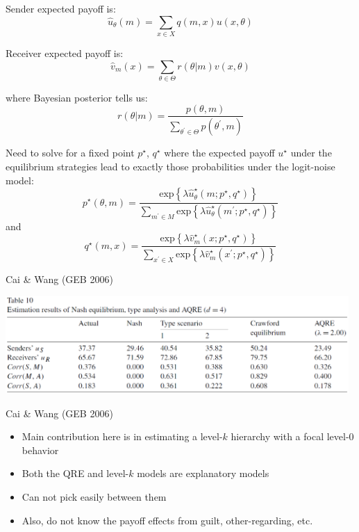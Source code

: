\documentclass{beamer}
\begin{document}
\begin{frame}
    \begin{card}
    			Sender expected payoff is:
    			$$\hat{u}_\theta(m)=\sum_{x\in X} q(m,x) u(x,\theta)$$
    			
    			Receiver expected payoff is:
    			$$\hat{v}_m(x)=\sum_{\theta\in \Theta} r(\theta\left| m\right. ) v(x,\theta )$$ 
    			
    			where Bayesian posterior tells us:
    			$$r(\theta\left| m\right. )=\frac{p(\theta,m)}{\sum_{\theta^\prime\in\Theta} p(\theta^\prime,m)}$$
    \end{card}
\end{frame}



\begin{frame}
\begin{card}
 Need to solve for a fixed point $p^\star$, $q^\star$ where the expected payoff $u^\star$ under the equilibrium strategies lead to exactly those probabilities under the logit-noise model:
 $$p^\star(\theta,m)=\frac{\text{exp}\left\{\lambda \hat{u}^\star_\theta(m;p^\star,q^\star)\right\}}{\sum_{m^\prime\in M} \text{exp}\left\{\lambda \hat{u}^\star_{\theta}(m^\prime;p^\star,q^\star)\right\}}$$
			and
			$$q^\star(m,x)= 
			\frac{\text{exp}\left\{\lambda \hat{v}^\star_m(x;p^\star,q^\star)\right\} }{\sum_{x^\prime\in X} \text{exp}\left\{\lambda \hat{v}^\star_{m}(x^\prime;p^\star,q^\star)\right\}  }$$
\end{card}
\end{frame}

\begin{frame}{Cai \& Wang (GEB 2006)}
\begin{card}
	\begin{center}\includegraphics[width=0.98\textwidth]{./i/cw2006Tbl10.eps}\end{center}
\end{card}
\end{frame}

\begin{frame}{Cai \& Wang (GEB 2006)}
\begin{card}
	\begin{itemize}
		\item Main contribution here is in estimating a level-$k$ hierarchy with a focal level-$0$ behavior
		\item Both the QRE and level-$k$ models are explanatory models
		\item Can not pick easily between them
		\item Also, do not know the payoff effects from guilt, other-regarding, etc.
	\end{itemize}
\end{card}
\end{frame}
\end{document}
